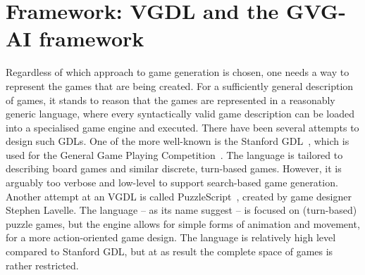 \documentclass[a4paper,titlepage,final]{report}
\begin{document}





\section{Framework: VGDL and the GVG-AI framework}
\label{sec_gvgaiframework}
Regardless of which approach to game generation is chosen, one needs a way to represent the games that are being created. %
For a sufficiently general description of games, it stands to reason that the games are represented in a reasonably generic language, where every syntactically valid game description can be loaded into a specialised game engine and executed. 
There have been several attempts to design such GDLs. One of the more well-known is the Stanford GDL~\citep{love2008general}, which is used for the General Game Playing Competition~\citep{genesereth2005general}. The language is tailored to describing board games and similar discrete, turn-based games. 
However, it is arguably too verbose and low-level to support search-based game generation. 
Another attempt at an VGDL is called PuzzleScript~\citep{puzzlescript}, created by game designer Stephen Lavelle. 
The language -- as its name suggest -- is focused on (turn-based) puzzle games, but the engine allows for simple forms of animation and movement, for a more action-oriented game design. 
The language is relatively high level compared to Stanford GDL, but at as result the complete space of  games is rather restricted.
\end{document}
